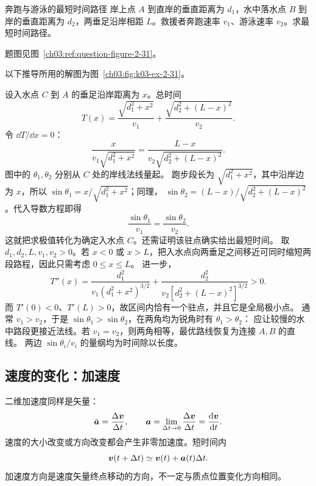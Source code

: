 {\begin{origexamplebox}{奔跑与游泳的最短时间路径}\label{ch03:ex:k03-2-31}
岸上点 $A$ 到直岸的垂直距离为 $d_1$，水中落水点 $B$ 到岸的垂直距离为 $d_2$，两垂足沿岸相距 $L$。救援者奔跑速率 $v_1$、游泳速率 $v_2$。求最短时间路径。
\par 题图见图~\ref{ch03:ref:question-figure-2-31}。
\KQuestionBF
\end{origexamplebox}
\begin{xesolution}
以下推导所用的解图为图~\ref{ch03:fig:k03-ex-2-31}。

设入水点 $C$ 到 $A$ 的垂足沿岸距离为 $x$。总时间
\RescueRouteDiagram
\[
T(x)=\frac{\sqrt{d_1^2+x^2}}{v_1}
+\frac{\sqrt{d_2^2+(L-x)^2}}{v_2}.
\]
令 $\dd T/\dd x=0$：
\[
\frac{x}{v_1\sqrt{d_1^2+x^2}}
=\frac{L-x}{v_2\sqrt{d_2^2+(L-x)^2}}.
\]
图中的 $\theta_1,\theta_2$ 分别从 $C$ 处的岸线法线量起。
跑步段长为 $\sqrt{d_1^2+x^2}$，其中沿岸边为 $x$，所以
$\sin\theta_1=x/\sqrt{d_1^2+x^2}$；同理，
$\sin\theta_2=(L-x)/\sqrt{d_2^2+(L-x)^2}$。代入导数方程即得
\[
  \boxed{\frac{\sin\theta_1}{v_1}=\frac{\sin\theta_2}{v_2}}.
\]
这就把求极值转化为确定入水点 $C$。还需证明该驻点确实给出最短时间。
取 $d_1,d_2,L,v_1,v_2>0$。若 $x<0$ 或 $x>L$，把入水点向两垂足之间移近可同时缩短两段路程，因此只需考虑 $0\le x\le L$。
进一步，
\[
 T''(x)=\frac{d_1^2}{v_1(d_1^2+x^2)^{3/2}}
       +\frac{d_2^2}{v_2[d_2^2+(L-x)^2]^{3/2}}>0.
\]
而 $T'(0)<0$、$T'(L)>0$，故区间内恰有一个驻点，并且它是全局极小点。
通常 $v_1>v_2$，于是 $\sin\theta_1>\sin\theta_2$，在两角均为锐角时有 $\theta_1>\theta_2$：
应让较慢的水中路段更接近法线。若 $v_1=v_2$，则两角相等，最优路线恢复为连接 $A,B$ 的直线。
两边 $\sin\theta_i/v_i$ 的量纲均为时间除以长度。
\end{xesolution}

\subsection{速度的变化：加速度}

二维加速度同样是矢量：
\begin{equation}
\bar{\bm{a}}=\frac{\Delta\bm{v}}{\Delta t},\qquad
\bm{a}=\lim_{\Delta t\to0}\frac{\Delta\bm{v}}{\Delta t}=\frac{\mathop{}\!\mathrm d\bm{v}}{\mathop{}\!\mathrm d t}.
\end{equation}
速度的大小改变或方向改变都会产生非零加速度。短时间内
\begin{equation}
\bm{v}(t+\Delta t)\simeq\bm{v}(t)+\bm{a}(t)\Delta t.
\end{equation}
加速度方向是速度矢量终点移动的方向，不一定与质点位置变化方向相同。

}
